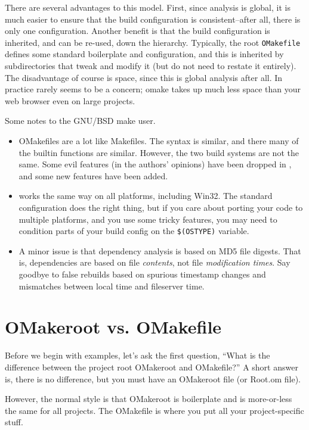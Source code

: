 There are several advantages to this model.  First, since analysis is global, it is much easier to
ensure that the build configuration is consistent--after all, there is only one configuration.
Another benefit is that the build configuration is inherited, and can be re-used, down the
hierarchy.  Typically, the root \verb+OMakefile+ defines some standard boilerplate and
configuration, and this is inherited by subdirectories that tweak and modify it (but do not need to
restate it entirely).  The disadvantage of course is space, since this is global analysis after all.
In practice rarely seems to be a concern; omake takes up much less space than your web browser even
on large projects.

Some notes to the GNU/BSD make user.
\begin{itemize}
\item OMakefiles are a lot like Makefiles.  The syntax is similar, and there many of the builtin
functions are similar.  However, the two build systems are not the same.  Some evil features (in the authors'
opinions) have been dropped in \OMake{}, and some new features have been added.

\item \OMake{} works the same way on all platforms, including Win32.  The standard configuration does
the right thing, but if you care about porting your code to multiple platforms, and you use some
tricky features, you may need to condition parts of your build config on the \verb+$(OSTYPE)+
variable.

\item A minor issue is that \OMake{} dependency analysis is based on MD5 file digests.  That is,
dependencies are based on file \emph{contents}, not file \emph{modification times}.  Say goodbye to
false rebuilds based on spurious timestamp changes and mismatches between local time and fileserver
time.
\end{itemize}

\section{OMakeroot vs. OMakefile}

Before we begin with examples, let's ask the first question, ``What is the difference between the
project root OMakeroot and OMakefile?''  A short answer is, there is no difference, but you must
have an OMakeroot file (or Root.om file).

However, the normal style is that OMakeroot is boilerplate and is more-or-less the same for all
projects.  The OMakefile is where you put all your project-specific stuff.


